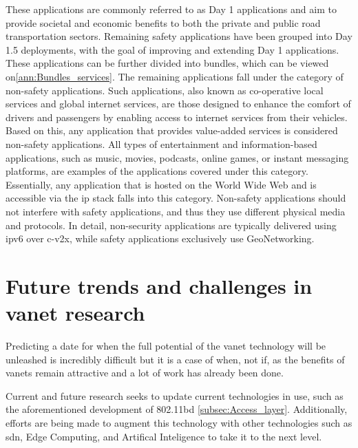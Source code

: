 These applications are commonly referred to as Day 1 applications and aim to provide societal and economic benefits to both the private and public road transportation sectors. Remaining safety applications have been grouped into Day 1.5 deployments, with the goal of improving and extending Day 1 applications. These applications can be further divided into bundles, which can be viewed on\ref{ann:Bundles_services}.
The remaining applications fall under the category of non-safety applications. Such applications, also known as co-operative local services and global internet services, are those designed to enhance the comfort of drivers and passengers by enabling access to internet services from their vehicles\cite{al-sultan_comprehensive_2014}. Based on this, any application that provides value-added services is considered non-safety applications\cite{toor_vehicle_2008}.
All types of entertainment and information-based applications, such as music, movies, podcasts, online games, or instant messaging platforms, are examples of the applications covered under this category. Essentially, any application that is hosted on the World Wide Web and is accessible via the \gls{ip} stack falls into this category.
Non-safety applications should not interfere with safety applications, and thus they use different physical media and protocols\cite{jakubiak_state_2008}. In detail, non-security applications are typically delivered using \gls{ipv6} over \gls{c-v2x}, while safety applications exclusively use GeoNetworking.


\section[Future trends and challenges in VANET research]{Future trends and challenges in \gls{vanet} research}
\label{sec:vanet_future}

Predicting a date for when the full potential of the \gls{vanet} technology will be unleashed is incredibly difficult but it is a case of when, not if, as the benefits of \glspl{vanet} remain attractive and a lot of work has already been done. 

Current and future research seeks to update current technologies in use, such as the aforementioned development of 802.11bd \ref{subsec:Access_layer}. Additionally, efforts are being made to augment this technology with other technologies such as \gls{sdn}, Edge Computing, and Artifical Inteligence to take it to the next level\cite{mahi_review_2022}.

